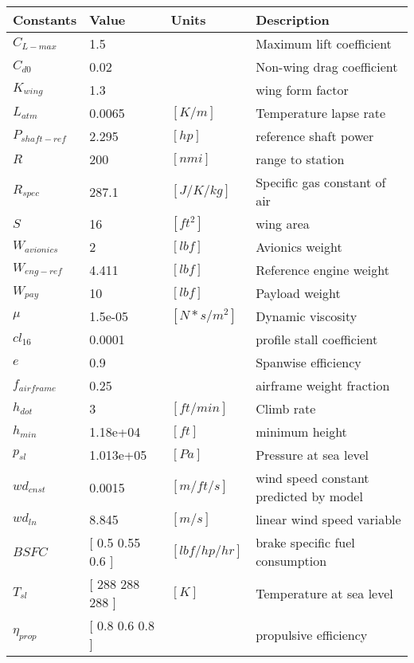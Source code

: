 {\footnotesize
\begin{longtable}{llll}
\toprule
Constants & Value & Units & Description \\
\midrule
$C_{L-max}$ & 1.5 & $ $ & Maximum lift coefficient \\
$C_{d0}$ & 0.02 & $ $ & Non-wing drag coefficient \\
$K_{wing}$ & 1.3 & $ $ & wing form factor \\
$L_{atm}$ & 0.0065 & $  [K/m] $ & Temperature lapse rate \\
$P_{shaft-ref}$ & 2.295 & $  [hp] $ & reference shaft power \\
$R$ & 200 & $  [nmi] $ & range to station \\
$R_{spec}$ & 287.1 & $  [J/K/kg] $ & Specific gas constant of air \\
$S$ & 16 & $  [ft^2] $ & wing area \\
$W_{avionics}$ & 2 & $  [lbf] $ & Avionics weight \\
$W_{eng-ref}$ & 4.411 & $  [lbf] $ & Reference engine weight \\
$W_{pay}$ & 10 & $  [lbf] $ & Payload weight \\
$\mu$ & 1.5e-05 & $  [N*s/m^2] $ & Dynamic viscosity \\
$cl_{16}$ & 0.0001 & $ $ & profile stall coefficient \\
$e$ & 0.9 & $ $ & Spanwise efficiency \\
$f_{airframe}$ & 0.25 & $ $ & airframe weight fraction \\
$h_{dot}$ & 3 & $  [ft/min] $ & Climb rate \\
$h_{min}$ & 1.18e+04 & $  [ft] $ & minimum height \\
$p_{sl}$ & 1.013e+05 & $  [Pa] $ & Pressure at sea level \\
$wd_{cnst}$ & 0.0015 & $  [m/ft/s] $ & wind speed constant predicted by model \\
$wd_{ln}$ & 8.845 & $  [m/s] $ & linear wind speed variable \\
$BSFC$ & [ 0.5       0.55      0.6      ] & $  [lbf/hp/hr] $ & brake specific fuel consumption \\
$T_{sl}$ & [ 288       288       288      ] & $  [K] $ & Temperature at sea level \\
$\eta_{prop}$ & [ 0.8       0.6       0.8      ] & $ $ & propulsive efficiency \\
\bottomrule
\end{longtable}}


